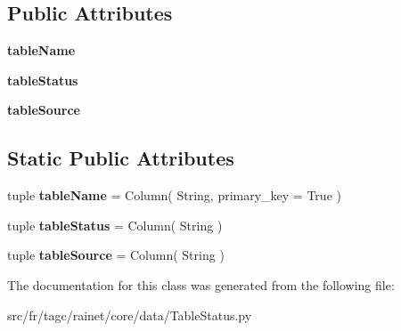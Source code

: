 \subsection*{Public Attributes}
\begin{DoxyCompactItemize}
\item 
\hypertarget{classsrc_1_1fr_1_1tagc_1_1rainet_1_1core_1_1data_1_1TableStatus_1_1TableStatus_a60e551210636cc84237c31c921fb56a0}{{\bfseries table\-Name}}\label{classsrc_1_1fr_1_1tagc_1_1rainet_1_1core_1_1data_1_1TableStatus_1_1TableStatus_a60e551210636cc84237c31c921fb56a0}

\item 
\hypertarget{classsrc_1_1fr_1_1tagc_1_1rainet_1_1core_1_1data_1_1TableStatus_1_1TableStatus_afe3e023b1c62b671c0cb12c1de79af88}{{\bfseries table\-Status}}\label{classsrc_1_1fr_1_1tagc_1_1rainet_1_1core_1_1data_1_1TableStatus_1_1TableStatus_afe3e023b1c62b671c0cb12c1de79af88}

\item 
\hypertarget{classsrc_1_1fr_1_1tagc_1_1rainet_1_1core_1_1data_1_1TableStatus_1_1TableStatus_af4d1a92dece0d55e73d1c63b43594eb8}{{\bfseries table\-Source}}\label{classsrc_1_1fr_1_1tagc_1_1rainet_1_1core_1_1data_1_1TableStatus_1_1TableStatus_af4d1a92dece0d55e73d1c63b43594eb8}

\end{DoxyCompactItemize}
\subsection*{Static Public Attributes}
\begin{DoxyCompactItemize}
\item 
\hypertarget{classsrc_1_1fr_1_1tagc_1_1rainet_1_1core_1_1data_1_1TableStatus_1_1TableStatus_ae4c577ad62aed67ec9a7220e1c49286c}{tuple {\bfseries table\-Name} = Column( String, primary\-\_\-key = True )}\label{classsrc_1_1fr_1_1tagc_1_1rainet_1_1core_1_1data_1_1TableStatus_1_1TableStatus_ae4c577ad62aed67ec9a7220e1c49286c}

\item 
\hypertarget{classsrc_1_1fr_1_1tagc_1_1rainet_1_1core_1_1data_1_1TableStatus_1_1TableStatus_aa25200094efe92b503c0725f2c5d80c8}{tuple {\bfseries table\-Status} = Column( String )}\label{classsrc_1_1fr_1_1tagc_1_1rainet_1_1core_1_1data_1_1TableStatus_1_1TableStatus_aa25200094efe92b503c0725f2c5d80c8}

\item 
\hypertarget{classsrc_1_1fr_1_1tagc_1_1rainet_1_1core_1_1data_1_1TableStatus_1_1TableStatus_a542c5e354e358eed5727182d3ff91678}{tuple {\bfseries table\-Source} = Column( String )}\label{classsrc_1_1fr_1_1tagc_1_1rainet_1_1core_1_1data_1_1TableStatus_1_1TableStatus_a542c5e354e358eed5727182d3ff91678}

\end{DoxyCompactItemize}


The documentation for this class was generated from the following file\-:\begin{DoxyCompactItemize}
\item 
src/fr/tagc/rainet/core/data/Table\-Status.\-py\end{DoxyCompactItemize}
